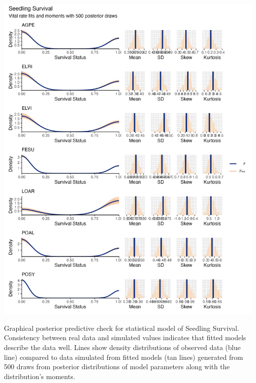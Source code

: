 \documentclass[lineno, sn-basic]{sn-jnl}%
\providecommand{\DIFadd}[1]{{\protect\color{blue}#1}} %
\providecommand{\DIFadd}[1]{{\protect\color{blue}\uwave{#1}}} %
\providecommand{\DIFdelbegin}{} %
\providecommand{\DIFaddFL}[1]{\DIFadd{#1}} %
\providecommand{\DIFaddbeginFL}{} %
\providecommand{\DIFaddendFL}{} %
\providecommand{\DIFdelendFL}{} %
\newcommand{\DIFscaledelfig}{0.5}
\newlength{\DIFdelgraphicswidth} %
\newlength{\DIFdelgraphicsheight} %
\newcommand{\DIFaddincludegraphics}[2][]{{\color{blue}\fbox{\DIFOincludegraphics[#1]{#2}}}} %
\newcommand{\DIFdelincludegraphics}[2][]{%
\sbox{\DIFdelgraphicsbox}{\DIFOincludegraphics[#1]{#2}}%
\settoboxwidth{\DIFdelgraphicswidth}{\DIFdelgraphicsbox} %
\settoboxtotalheight{\DIFdelgraphicsheight}{\DIFdelgraphicsbox} %
\scalebox{\DIFscaledelfig}{%
\parbox[b]{\DIFdelgraphicswidth}{\usebox{\DIFdelgraphicsbox}\\[-\baselineskip] \rule{\DIFdelgraphicswidth}{0em}}\llap{\resizebox{\DIFdelgraphicswidth}{\DIFdelgraphicsheight}{%
\setlength{\unitlength}{\DIFdelgraphicswidth}%
\begin{picture}(1,1)%
\thicklines\linethickness{2pt} %
{\color[rgb]{1,0,0}\put(0,0){\framebox(1,1){}}}%
{\color[rgb]{1,0,0}\put(0,0){\line( 1,1){1}}}%
{\color[rgb]{1,0,0}\put(0,1){\line(1,-1){1}}}%
\end{picture}%
}\hspace*{3pt}}} %
} %
\DeclareRobustCommand{\DIFdelbegin}{\DIFOdelbegin \let\includegraphics\DIFdelincludegraphics} %
\DeclareRobustCommand{\DIFaddbeginFL}{\DIFOaddbeginFL \let\includegraphics\DIFaddincludegraphics} %
\DeclareRobustCommand{\DIFaddendFL}{\DIFOaddendFL \let\includegraphics\DIFOincludegraphics} %
\DeclareRobustCommand{\DIFdelendFL}{\DIFOaddendFL \let\includegraphics\DIFOincludegraphics} %
\begin{document}
\DIFdelbegin %
\DIFdelendFL \DIFaddbeginFL \newpage












\begin{myfigure}[H]
	\DIFaddendFL \centering
	\DIFaddbeginFL \includegraphics[width = \linewidth]{seedsurvbyspecies_densplot.png}
	\caption[Graphical posterior predictive check for statistical model of Seedling Survival]{\DIFaddFL{Graphical posterior predictive check for statistical model of Seedling Survival. Consistency between real data and simulated values indicates that fitted models describe the data well. Lines show density distributions of observed data (blue line) compared to data simulated from fitted models (tan lines) generated from 500 draws from posterior distributions of model parameters along with the distribution's moments.}}
\end{myfigure}
\end{document}
